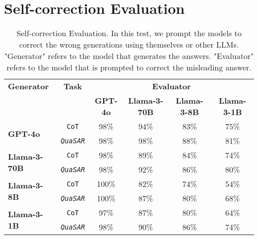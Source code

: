 \documentclass[11pt]{article}
\newcommand{\QuaSAR}{\emph{QuaSAR}\xspace}
\begin{document}
\begin{table*}
\section{Self-correction Evaluation}
\centering
\begin{tabular}{l|c|cccc}
\toprule
\textbf{Generator} & \textbf{Task} & \multicolumn{4}{c}{\textbf{Evaluator}} \\
\cmidrule{3-6}
 & & \textbf{GPT-4o} & \textbf{Llama-3-70B} & \textbf{Llama-3-8B} & \textbf{Llama-3-1B} \\
\midrule
\hline
\multirow{2}{*}{\textbf{GPT-4o}} & \texttt{CoT} & \cellcolor{inndomain} 98\% & \cellcolor{outdomain} 94\% & \cellcolor{outdomain} 83\% & \cellcolor{outdomain} 75\% \\
 & \texttt{\QuaSAR} & \cellcolor{inndomain} 98\% & \cellcolor{outdomain} 98\% & \cellcolor{outdomain} 88\% & \cellcolor{outdomain} 81\% \\
\hline
\multirow{2}{*}{\textbf{Llama-3-70B}} & \texttt{CoT} & \cellcolor{outdomain} 98\% & \cellcolor{inndomain} 89\% & \cellcolor{outdomain} 84\% & \cellcolor{outdomain} 74\% \\
 & \texttt{\QuaSAR} & \cellcolor{outdomain} 98\% & \cellcolor{inndomain} 92\% & \cellcolor{outdomain} 86\% & \cellcolor{outdomain} 80\% \\
\hline
\multirow{2}{*}{\textbf{Llama-3-8B}} & \texttt{CoT} & \cellcolor{outdomain} 100\% & \cellcolor{outdomain}82\% & \cellcolor{inndomain} 74\% & \cellcolor{outdomain} 54\% \\
 & \texttt{\QuaSAR} & \cellcolor{outdomain} 100\% & \cellcolor{outdomain} 87\% & \cellcolor{inndomain} 80\% & \cellcolor{outdomain} 68\% \\
\hline
\multirow{2}{*}{\textbf{Llama-3-1B}} & \texttt{CoT} & \cellcolor{outdomain} 97\% & \cellcolor{outdomain} 87\% & \cellcolor{outdomain} 80\% & \cellcolor{inndomain} 64\% \\
& \texttt{\QuaSAR} & \cellcolor{outdomain} 98\% & \cellcolor{outdomain} 90\% & \cellcolor{outdomain} 86\% & \cellcolor{inndomain} 74\% \\
\bottomrule
\end{tabular}
\caption{Self-correction Evaluation. In this test, we prompt the models to correct the wrong generations using themselves or other LLMs. "Generator" refers to the model that generates the answers. "Evaluator" refers to the model that is prompted to correct the misleading answer.}
\label{tab:self_consistency}
\end{table*}
\end{document}
